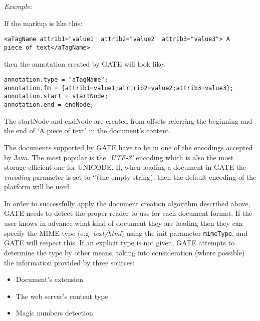 {\em Example:}

If the markup is like this:

\small
\begin{small}
\begin{verbatim}
<aTagName attrib1="value1" attrib2="value2" attrib3="value3"> A
piece of text</aTagName>
\end{verbatim}
\end{small}
\nnormalsize

then the annotation created by GATE will look like:

\small
\begin{small}
\begin{verbatim}
annotation.type = "aTagName";
annotation.fm = {attrib1=value1;atrtrib2=value2;attrib3=value3};
annotation.start = startNode;
annotation.end = endNode;
\end{verbatim}
\end{small}
\nnormalsize

The startNode and endNode are created from offsets referring the
beginning and the end of `A piece of text' in the document's
content.

The documents supported by GATE have to be in one of the encodings
accepted by Java. The most popular is the {\em `UTF-8'} encoding
which is also the most storage efficient one for UNICODE. If, when
loading a document in GATE the {\em encoding} parameter is set to
`'(the empty string), then the default encoding of the platform
will be used.



In order to successfully apply the document creation algorithm described above,
GATE needs to detect the proper reader to use for each document format.  If the
user knows in advance what kind of document they are loading then they can
specify the MIME type (e.g. {\em text/html}) using the init parameter
{\tt mimeType}, and GATE will respect this.  If an explicit type is not given,
GATE attempts to determine the type by other means, taking
into consideration (where possible) the information provided by three
sources:
\begin{itemize}
\item
Document's extension
\item
The web server's content type
\item
Magic numbers detection
\end{itemize}

